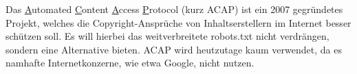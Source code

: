 Das \underline{A}utomated \underline{C}ontent \underline{A}ccess \underline{P}rotocol (kurz ACAP) ist ein 2007 gegründetes Projekt, welches die Copyright-Ansprüche von Inhaltserstellern im Internet besser schützen soll.\cite{acap-was} Es will hierbei das weitverbreitete robots.txt nicht verdrängen, sondern eine Alternative bieten. ACAP wird heutzutage kaum verwendet,  da es namhafte Internetkonzerne, wie etwa Google, nicht nutzen\cite{acap-google}.